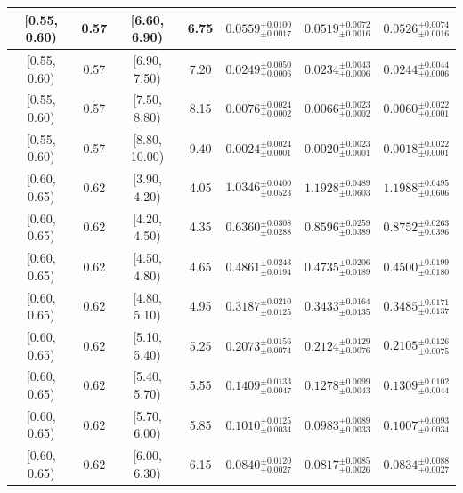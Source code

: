 \begin{longtable}{|c|c|c|c|c|c|c|}
\hline
[0.55, 0.60) & 0.57 & [6.60, 6.90) & 6.75 & $0.0559^{ \pm 0.0100 }_{ \pm 0.0017 }$ & $0.0519^{ \pm 0.0072 }_{ \pm 0.0016 }$ & $0.0526^{ \pm 0.0074 }_{ \pm 0.0016 }$ \\ 
\hline
[0.55, 0.60) & 0.57 & [6.90, 7.50) & 7.20 & $0.0249^{ \pm 0.0050 }_{ \pm 0.0006 }$ & $0.0234^{ \pm 0.0043 }_{ \pm 0.0006 }$ & $0.0244^{ \pm 0.0044 }_{ \pm 0.0006 }$ \\ 
\hline
[0.55, 0.60) & 0.57 & [7.50, 8.80) & 8.15 & $0.0076^{ \pm 0.0024 }_{ \pm 0.0002 }$ & $0.0066^{ \pm 0.0023 }_{ \pm 0.0002 }$ & $0.0060^{ \pm 0.0022 }_{ \pm 0.0001 }$ \\ 
\hline
[0.55, 0.60) & 0.57 & [8.80, 10.00) & 9.40 & $0.0024^{ \pm 0.0024 }_{ \pm 0.0001 }$ & $0.0020^{ \pm 0.0023 }_{ \pm 0.0001 }$ & $0.0018^{ \pm 0.0022 }_{ \pm 0.0001 }$ \\ 
\hline
[0.60, 0.65) & 0.62 & [3.90, 4.20) & 4.05 & $1.0346^{ \pm 0.0400 }_{ \pm 0.0523 }$ & $1.1928^{ \pm 0.0489 }_{ \pm 0.0603 }$ & $1.1988^{ \pm 0.0495 }_{ \pm 0.0606 }$ \\ 
\hline
[0.60, 0.65) & 0.62 & [4.20, 4.50) & 4.35 & $0.6360^{ \pm 0.0308 }_{ \pm 0.0288 }$ & $0.8596^{ \pm 0.0259 }_{ \pm 0.0389 }$ & $0.8752^{ \pm 0.0263 }_{ \pm 0.0396 }$ \\ 
\hline
[0.60, 0.65) & 0.62 & [4.50, 4.80) & 4.65 & $0.4861^{ \pm 0.0243 }_{ \pm 0.0194 }$ & $0.4735^{ \pm 0.0206 }_{ \pm 0.0189 }$ & $0.4500^{ \pm 0.0199 }_{ \pm 0.0180 }$ \\ 
\hline
[0.60, 0.65) & 0.62 & [4.80, 5.10) & 4.95 & $0.3187^{ \pm 0.0210 }_{ \pm 0.0125 }$ & $0.3433^{ \pm 0.0164 }_{ \pm 0.0135 }$ & $0.3485^{ \pm 0.0171 }_{ \pm 0.0137 }$ \\ 
\hline
[0.60, 0.65) & 0.62 & [5.10, 5.40) & 5.25 & $0.2073^{ \pm 0.0156 }_{ \pm 0.0074 }$ & $0.2124^{ \pm 0.0129 }_{ \pm 0.0076 }$ & $0.2105^{ \pm 0.0126 }_{ \pm 0.0075 }$ \\ 
\hline
[0.60, 0.65) & 0.62 & [5.40, 5.70) & 5.55 & $0.1409^{ \pm 0.0133 }_{ \pm 0.0047 }$ & $0.1278^{ \pm 0.0099 }_{ \pm 0.0043 }$ & $0.1309^{ \pm 0.0102 }_{ \pm 0.0044 }$ \\ 
\hline
[0.60, 0.65) & 0.62 & [5.70, 6.00) & 5.85 & $0.1010^{ \pm 0.0125 }_{ \pm 0.0034 }$ & $0.0983^{ \pm 0.0089 }_{ \pm 0.0033 }$ & $0.1007^{ \pm 0.0093 }_{ \pm 0.0034 }$ \\ 
\hline
[0.60, 0.65) & 0.62 & [6.00, 6.30) & 6.15 & $0.0840^{ \pm 0.0120 }_{ \pm 0.0027 }$ & $0.0817^{ \pm 0.0085 }_{ \pm 0.0026 }$ & $0.0834^{ \pm 0.0088 }_{ \pm 0.0027 }$ \\ 
\hline

\end{longtable}
